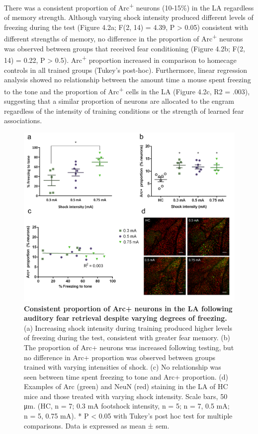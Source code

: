 \documentclass[12pt,a4paperpaper,]{report}
\begin{document}
There was a consistent proportion of Arc\textsuperscript{+} neurons
(10-15\%) in the LA regardless of memory strength. Although varying
shock intensity produced different levels of freezing during the test
(Figure 4.2a; F(2, 14) = 4.39, P \textgreater{} 0.05) consistent with
different strengths of memory, no difference in the proportion of
Arc\textsuperscript{+} neurons was observed between groups that received
fear conditioning (Figure 4.2b; F(2, 14) = 0.22, P \textgreater{} 0.5).
Arc\textsuperscript{+} proportion increased in comparison to homecage
controls in all trained groups (Tukey's post-hoc). Furthermore, linear
regression analysis showed no relationship between the amount time a
mouse spent freezing to the tone and the proportion of
Arc\textsuperscript{+} cells in the LA (Figure 4.2c, R2 = .003),
suggesting that a similar proportion of neurons are allocated to the
engram regardless of the intensity of training conditions or the
strength of learned fear associations.

\begin{figure}[htbp]
\centering
\includegraphics{source/figures/figure_2.jpg}
\caption{\textbf{Consistent proportion of Arc+ neurons in the LA
following auditory fear retrieval despite varying degrees of freezing.}
(a) Increasing shock intensity during training produced higher levels of
freezing during the test, consistent with greater fear memory. (b) The
proportion of Arc+ neurons was increased following testing, but no
difference in Arc+ proportion was observed between groups trained with
varying intensities of shock. (c) No relationship was seen between time
spent freezing to tone and Arc+ proportion. (d) Examples of Arc (green)
and NeuN (red) staining in the LA of HC mice and those treated with
varying shock intensity. Scale bars, 50 μm. (HC, n = 7; 0.3 mA footshock
intensity, n = 5; n = 7, 0.5 mA; n = 5, 0.75 mA). * P \textless{} 0.05
with Tukey's post hoc test for multiple comparisons. Data is expressed
as mean ± sem. \label{ref_a_figure}}
\end{figure}
\end{document}
